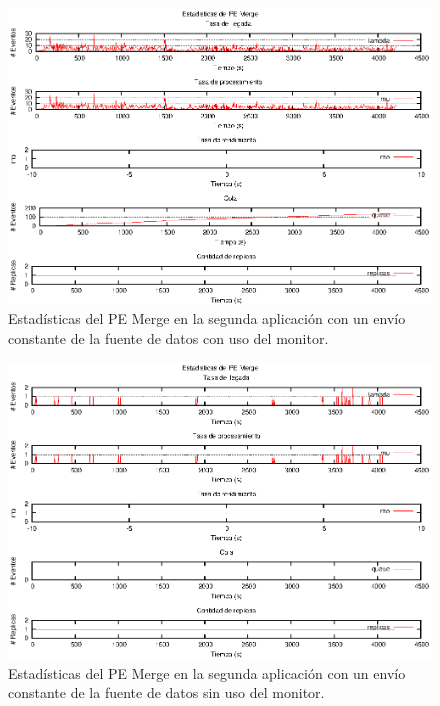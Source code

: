\begin{figure}[p]
\centering
    \includegraphics[scale=1.1]{images/exp/app2/uniform/cm/statusMergePE.eps}
    \caption{Estadísticas del PE Merge en la segunda aplicación con un envío constante de la fuente de datos con uso del monitor.}
    \label{fig:app2-uniform-statusMergePE-cm}
\end{figure}

\begin{figure}[p]
\centering
    \includegraphics[scale=1.1]{images/exp/app2/uniform/sm/statusMergePE.eps}
    \caption{Estadísticas del PE Merge en la segunda aplicación con un envío constante de la fuente de datos sin uso del monitor.}
    \label{fig:app2-uniform-statusMergePE-sm}
\end{figure}

